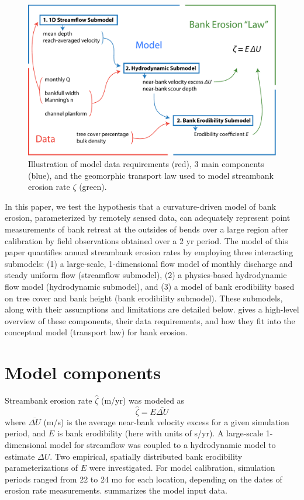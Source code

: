 \documentclass[preprint, review, authoryear, 12pt]{elsarticle}
\begin{document}
\begin{figure}
\includegraphics[width=1\textwidth]{figs/model-components.pdf}
\caption{Illustration of model data requirements (red), 3 main components (blue), and the geomorphic transport law used to model streambank erosion rate $\zeta$ (green).}\label{fig:model-components}
\end{figure}

In this paper, we test the hypothesis that a curvature-driven model of bank erosion, parameterized by remotely sensed data, can adequately represent point measurements of bank retreat at the outsides of bends over a large region after calibration by field observations obtained over a 2 yr period. The model of this paper quantifies annual streambank erosion rates by employing three interacting submodels: (1) a large-scale, 1-dimensional flow model of monthly discharge and steady uniform flow (streamflow submodel), (2) a physics-based hydrodynamic flow model (hydrodynamic submodel), and (3) a model of bank erodibility based on tree cover and bank height (bank erodibility submodel). These submodels, along with their assumptions and limitations are detailed below.  gives a high-level overview of these components, their data requirements, and how they fit into the conceptual model (transport law) for bank erosion.

\section{Model components}

Streambank erosion rate $\hat{\zeta}$ (m/yr) was modeled as
\begin{equation}\label{eq:equation}
\hat{\zeta} = E \overline{\Delta U}
\end{equation}
where $\overline{\Delta U}$ (m/s) is the average near-bank velocity excess for a given simulation period, and $E$ is bank erodibility (here with units of s/yr). A large-scale 1-dimensional model for streamflow was coupled to a hydrodynamic model to estimate $\Delta U$. Two empirical, spatially distributed bank erodibility parameterizations of $E$ were investigated. For model calibration, simulation periods ranged from 22 to 24 mo for each location, depending on the dates of erosion rate measurements.  summarizes the model input data. 
\end{document}
